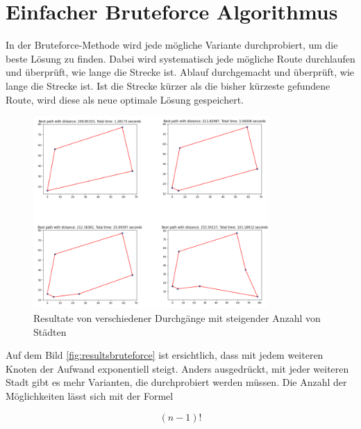 %
%
%
%
\usepackage{pgfplots}
\section{Einfacher Bruteforce Algorithmus
\label{buch:paper:varalg:section:bruteforce}}
In der Bruteforce-Methode wird jede mögliche Variante durchprobiert, 
um die beste Lösung zu finden. Dabei wird systematisch jede mögliche
Route durchlaufen und überprüft, wie lange die Strecke ist.  
Ablauf durchgemacht und überprüft, wie lange die Strecke ist.
Ist die Strecke kürzer als die bisher kürzeste gefundene Route, 
wird diese als neue optimale Lösung gespeichert.

\begin{figure}
    \centering
    \includegraphics[width=0.8\textwidth]{
        papers/varalg/images/teil2/02BruteforceMethode.png
    }
    \caption{Resultate von verschiedener Durchgänge mit steigender Anzahl von Städten}
    \label{fig:results_bruteforce}
\end{figure}

Auf dem Bild \ref{fig:resultsbruteforce} ist ersichtlich, dass mit 
jedem weiteren Knoten der Aufwand exponentiell steigt. Anders 
ausgedrückt, mit jeder weiteren Stadt gibt es mehr Varianten, die 
durchprobiert werden müssen. Die Anzahl der Möglichkeiten lässt sich 
mit der Formel

\begin{equation}
    (n-1)!
\end{equation}

